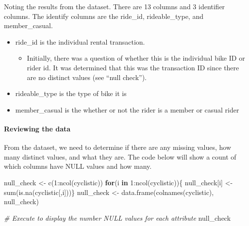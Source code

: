 \documentclass[
]{article}
\newenvironment{Shaded}{\begin{snugshade}}{\end{snugshade}}
\newcommand{\CommentTok}[1]{\textcolor[rgb]{0.56,0.35,0.01}{\textit{#1}}}
\newcommand{\ControlFlowTok}[1]{\textcolor[rgb]{0.13,0.29,0.53}{\textbf{#1}}}
\newcommand{\DecValTok}[1]{\textcolor[rgb]{0.00,0.00,0.81}{#1}}
\newcommand{\FunctionTok}[1]{\textcolor[rgb]{0.00,0.00,0.00}{#1}}
\newcommand{\NormalTok}[1]{#1}
\newcommand{\OtherTok}[1]{\textcolor[rgb]{0.56,0.35,0.01}{#1}}
\newcommand{\SpecialCharTok}[1]{\textcolor[rgb]{0.00,0.00,0.00}{#1}}
\providecommand{\tightlist}{%
  \setlength{\itemsep}{0pt}\setlength{\parskip}{0pt}}
\begin{document}
Noting the results from the dataset. There are 13 columns and 3
identifier columns. The identify columns are the ride\_id,
rideable\_type, and member\_casual.

\begin{itemize}
\tightlist
\item
  ride\_id is the individual rental transaction.

  \begin{itemize}
  \tightlist
  \item
    Initially, there was a question of whether this is the individual
    bike ID or rider id. It was determined that this was the transaction
    ID since there are no distinct values (see ``null check'').
  \end{itemize}
\item
  rideable\_type is the type of bike it is
\item
  member\_casual is the whether or not the rider is a member or casual
  rider
\end{itemize}

\hypertarget{reviewing-the-data}{%
\paragraph{Reviewing the data}\label{reviewing-the-data}}

From the dataset, we need to determine if there are any missing values,
how many distinct values, and what they are. The code below will show a
count of which columns have NULL values and how many.

\begin{Shaded}
\begin{Highlighting}[]
\NormalTok{null\_check }\OtherTok{\textless{}{-}} \FunctionTok{c}\NormalTok{(}\DecValTok{1}\SpecialCharTok{:}\FunctionTok{ncol}\NormalTok{(cyclistic))}
  \ControlFlowTok{for}\NormalTok{(i }\ControlFlowTok{in} \DecValTok{1}\SpecialCharTok{:}\FunctionTok{ncol}\NormalTok{(cyclistic))\{}
\NormalTok{    null\_check[i] }\OtherTok{\textless{}{-}} \FunctionTok{sum}\NormalTok{(}\FunctionTok{is.na}\NormalTok{(cyclistic[,i]))\}}
\NormalTok{null\_check }\OtherTok{\textless{}{-}} \FunctionTok{data.frame}\NormalTok{(}\FunctionTok{colnames}\NormalTok{(cyclistic), null\_check)}
\end{Highlighting}
\end{Shaded}

\begin{Shaded}
\begin{Highlighting}[]
\CommentTok{\# Execute to display the number NULL values for each attribute}
\NormalTok{null\_check}
\end{Highlighting}
\end{Shaded}
\end{document}
